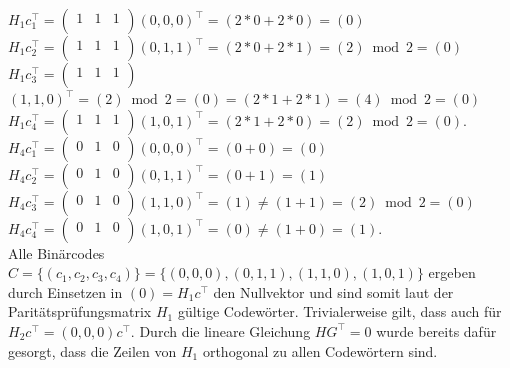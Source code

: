 \begin{Beispiel}
    $H_1c^\intercal_1 =$$\left( \begin{array}{rrr}
    1 & 1 & 1 \\
    \end{array}\right) 
    $$(0,0,0)^\intercal=(2*0+2*0)=(0)$\\
    $H_1c^\intercal_2 =$$\left( \begin{array}{rrr}
    1 & 1 & 1 \\
    \end{array}\right) 
    $$(0,1,1)^\intercal=(2*0+2*1)=(2)\bmod 2= (0)$\\
    $H_1c^\intercal_3 =$$\left( \begin{array}{rrr}
    1 & 1 & 1 \\
    \end{array}\right) 
    $$(1,1,0)^\intercal=(2)\bmod 2=(0)=(2*1+2*1)=(4)\bmod 2= (0)$\\
    $H_1c^\intercal_4 =$$\left( \begin{array}{rrr}
    1 & 1 & 1 \\
    \end{array}\right) 
    $$(1,0,1)^\intercal=(2*1+2*0)=(2)\bmod 2= (0).$\\
    
    
    $H_4c^\intercal_1 =$$\left( \begin{array}{rrr}
    0 & 1 & 0 \\
    \end{array}\right) 
    $$(0,0,0)^\intercal=(0+0)=(0)$\\
    $H_4c^\intercal_2 =$$\left( \begin{array}{rrr}
    0 & 1 & 0 \\
    \end{array}\right) 
    $$(0,1,1)^\intercal=(0+1)=(1)$\\
    $H_4c^\intercal_3 =$$\left( \begin{array}{rrr}
    0 & 1 & 0 \\
    \end{array}\right) 
    $$(1,1,0)^\intercal=(1)\neq (1+1)=(2)\bmod 2= (0)$\\
    $H_4c^\intercal_4 =$$\left( \begin{array}{rrr}
    0 & 1 & 0 \\
    \end{array}\right) 
    $$(1,0,1)^\intercal=(0)\neq(1+0)=(1).$\\
    
    Alle Binärcodes $C=\{(c_1, c_2, c_3, c_4)\} = \{(0,0,0),(0,1,1),(1,1,0),(1,0,1)\}$ ergeben durch Einsetzen in $(0) = H_1c^\intercal$
    den Nullvektor und sind somit laut der Paritätspr{\"u}fungsmatrix $H_1$ gültige Codewörter. Trivialerweise gilt, dass auch für $H_2c^\intercal = (0,0,0)c^\intercal$. Durch die lineare Gleichung $HG^\intercal= 0$ wurde bereits dafür gesorgt, dass die Zeilen von $H_1$ orthogonal zu allen Codewörtern sind.\\
    

\end{Beispiel}
